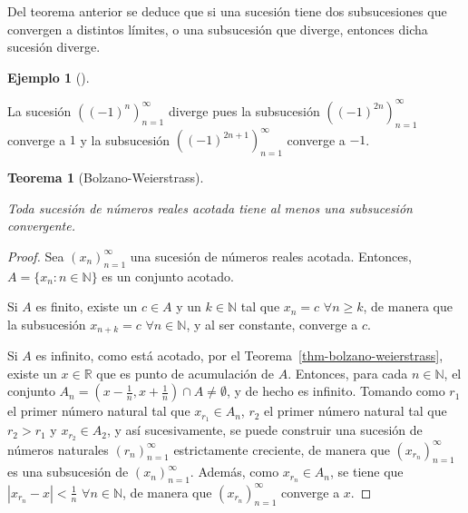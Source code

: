 \documentclass[
  a4paper,
]{scrreport}
\theoremstyle{definition}
\newtheorem{example}{Ejemplo}[chapter]
\theoremstyle{plain}
\theoremstyle{definition}
\theoremstyle{plain}
\newtheorem{theorem}{Teorema}[chapter]
\theoremstyle{plain}
\theoremstyle{remark}
\begin{document}
Del teorema anterior se deduce que si una sucesión tiene dos
subsucesiones que convergen a distintos límites, o una subsucesión que
diverge, entonces dicha sucesión diverge.

\leavevmode{}%
\begin{example}[]\label{exm-subsucesiones-distintos-limites}

La sucesión \(((-1)^n)_{n=1}^\infty\) diverge pues la subsucesión
\(((-1)^{2n})_{n=1}^\infty\) converge a \(1\) y la subsucesión
\(((-1)^{2n+1})_{n=1}^\infty\) converge a \(-1\).

\end{example}

\leavevmode{}%
\begin{theorem}[Bolzano-Weierstrass]\label{thm-bolzano-weierstrass-sucesiones}

Toda sucesión de números reales acotada tiene al menos una subsucesión
convergente.

\end{theorem}

\begin{tcolorbox}[enhanced jigsaw, breakable, arc=.35mm, colbacktitle=quarto-callout-note-color!10!white, toptitle=1mm, opacityback=0, colframe=quarto-callout-note-color-frame, colback=white, left=2mm, bottomrule=.15mm, opacitybacktitle=0.6, title=\textcolor{quarto-callout-note-color}{\faInfo}\hspace{0.5em}{Demostración}, toprule=.15mm, titlerule=0mm, coltitle=black, rightrule=.15mm, bottomtitle=1mm, leftrule=.75mm]

\begin{proof}

Sea \((x_n)_{n=1}^\infty\) una sucesión de números reales acotada.
Entonces, \(A=\{x_n:n\in\mathbb{N}\}\) es un conjunto acotado.

Si \(A\) es finito, existe un \(c\in A\) y un \(k\in\mathbb{N}\) tal que
\(x_n=c\) \(\forall n\geq k\), de manera que la subsucesión
\(x_{n+k}=c\) \(\forall n\in\mathbb{N}\), y al ser constante, converge a
\(c\).

Si \(A\) es infinito, como está acotado, por el
Teorema~\ref{thm-bolzano-weierstrass}, existe un \(x\in\mathbb{R}\) que
es punto de acumulación de \(A\). Entonces, para cada
\(n\in\mathbb{N}\), el conjunto
\(A_n=(x-\frac{1}{n},x+\frac{1}{n})\cap A\neq \emptyset\), y de hecho es
infinito. Tomando como \(r_1\) el primer número natural tal que
\(x_{r_1}\in A_n\), \(r_2\) el primer número natural tal que \(r_2>r_1\)
y \(x_{r_2}\in A_2\), y así sucesivamente, se puede construir una
sucesión de números naturales \((r_n)_{n=1}^\infty\) estrictamente
creciente, de manera que \((x_{r_n})_{n=1}^\infty\) es una subsucesión
de \((x_n)_{n=1}^\infty\). Además, como \(x_{r_n}\in A_n\), se tiene que
\(|x_{r_n}-x|<\frac{1}{n}\) \(\forall n\in\mathbb{N}\), de manera que
\((x_{r_n})_{n=1}^\infty\) converge a \(x\).

\end{proof}

\end{tcolorbox}
\end{document}
